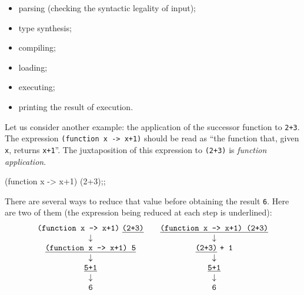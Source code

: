 \begin{itemize}
\item parsing (checking the syntactic legality of input);
\item type synthesis;
\item compiling;
\item loading;
\item executing;
\item printing the result of execution.
\end{itemize}
%
Let us consider another example: the application of the successor function to
\verb|2+3|. The expression
\verb|(function x -> x+1)|
should be read as ``the function that, given {\tt x}, returns
\verb|x+1|''. The juxtaposition of this expression to \verb|(2+3)| is
{\em function application}.
\begin{caml_example}
(function x -> x+1) (2+3);;
\end{caml_example}
There are several ways to reduce that value before obtaining the result
\verb"6". Here are two of them (the expression being reduced at each
step is underlined):
$$\begin{array}{c@{\qquad}c}
\mbox{\tt (function x -> x+1)} ~ \underline{\mbox{\tt (2+3)}} &
        \underline{\mbox{\tt (function x -> x+1) (2+3)}} \\
\downarrow & \downarrow \\
\underline{\mbox{\tt (function x -> x+1) 5}} &
        \underline{\mbox{\tt (2+3)}} ~ \mbox{\tt + 1} \\
\downarrow & \downarrow \\
\underline{\mbox{\tt 5+1}} &
        \underline{\mbox{\tt 5+1}} \\
\downarrow & \downarrow \\
\tt 6 & \tt 6
\end{array}$$

